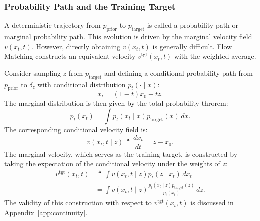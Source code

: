 \subsubsection{Probability Path and the Training Target}

A deterministic trajectory from $p_\text{prior}$ to $p_\text{target}$ is called a probability path or marginal probability path. This evolution is driven by the marginal velocity field $v(x_t, t)$. However, directly obtaining $v(x_t, t)$ is generally difficult. Flow Matching constructs an equivalent velocity $v^\text{tgt}(x_t, t)$ with the weighted average.

Consider sampling $z$ from $p_\text{target}$ and defining a conditional probability path from $p_\text{prior}$ to $\delta_z$ with conditional distribution $p_t(\cdot \mid x)$:
%
\begin{equation}
x_t = (1 - t) x_0 + t z.
\end{equation}
%
The marginal distribution is then given by the total probability throrem:
%
\begin{equation*}
p_t(x_t) = \int p_t(x_t \mid x) p_\text{target}(x) \, dx.
\end{equation*}
%
The corresponding conditional velocity field is:
%
\begin{equation}\label{ode_cond}
  v(x_t, t \mid z) \triangleq \frac{d x_t}{d t} = z - x_0.
\end{equation}
%
The marginal velocity, which serves as the training target, is constructed by taking the expectation of the conditional velocity under the weights of $z$:
%
\begin{align}
  v^\text{tgt}(x_t, t) &\triangleq \int v(x_t, t \mid z) p_t(z \mid x_t) \, d x_t \nonumber \\
  &= \int v(x_t, t \mid z) \frac{p_t(x_t \mid z) p_\text{target}(z)}{p_t(x_t)} \, dz.
\end{align}
%
The validity of this construction with respect to $v^\text{tgt} (x_t, t)$ is discussed in Appendix~\ref{app:continuity}.

